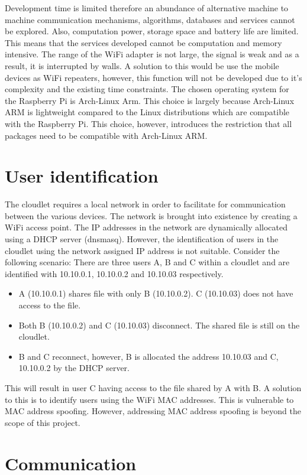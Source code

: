 Development time is limited therefore an abundance of alternative machine to machine communication mechanisms, algorithms, databases and services cannot be explored. Also, computation power, storage space
and battery life are limited. This means that the services developed cannot be computation and memory intensive. The range of the WiFi adapter is not large, the signal is weak and as a result, it is interrupted by
walls. A solution to this would be use the mobile devices as WiFi repeaters, however, this function will not be developed due to it's complexity and the existing time constraints. The chosen operating system for the
Raspberry Pi is Arch-Linux Arm. This choice is largely because Arch-Linux ARM is lightweight compared to the Linux distributions which are compatible with the Raspberry Pi. This choice, however, introduces the restriction
that all packages need to be compatible with Arch-Linux ARM.

\section{User identification}

The cloudlet requires a local network in order to facilitate for communication between the various devices. The network is brought into existence by creating a WiFi access point. The IP addresses in the network are
dynamically allocated using a DHCP server (dnsmasq). However, the identification of users in the cloudlet using the network assigned IP address is not suitable. Consider the following scenario: There are three users
A, B and C within a cloudlet and are identified with 10.10.0.1, 10.10.0.2 and 10.10.03 respectively.
\begin{itemize}
\item A (10.10.0.1) shares file with only B (10.10.0.2). C (10.10.03) does not have access to the file.
\item Both B (10.10.0.2) and C (10.10.03) disconnect. The shared file is still on the cloudlet.
\item B and C reconnect, however, B is allocated the address 10.10.03 and C, 10.10.0.2 by the DHCP server.
\end{itemize}
This will result in user C having access to the file shared by A with B. A solution to this is to identify users using the WiFi MAC addresses. This is vulnerable to MAC address spoofing. However, addressing MAC address
spoofing is beyond the scope of this project.

\section{Communication}
\label{communication}

